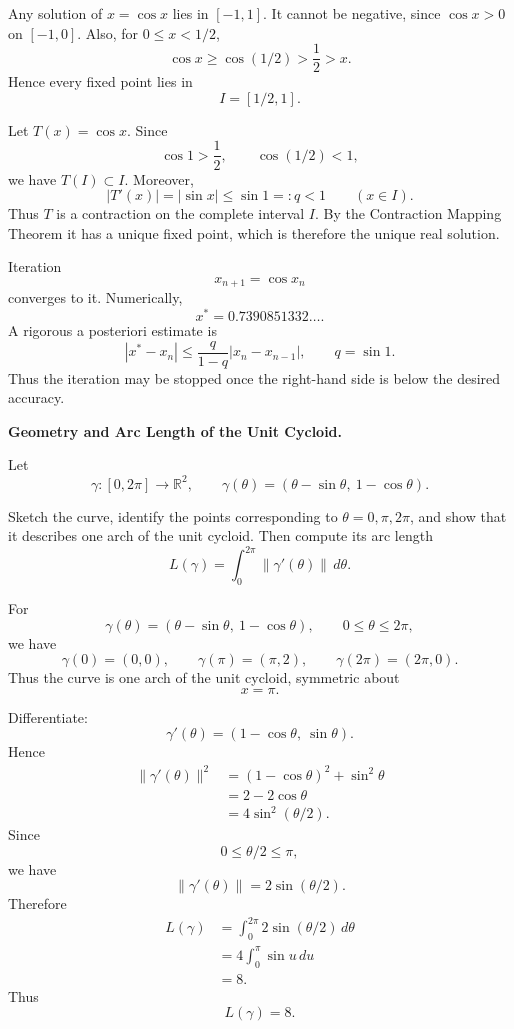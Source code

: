 \begin{solution}
Any solution of \(x=\cos x\) lies in \([-1,1]\). It cannot be negative, since
\(\cos x>0\) on \([-1,0]\). Also, for \(0\le x<1/2\),
\[
\cos x\ge\cos(1/2)>\frac12>x.
\]
Hence every fixed point lies in
\[
I=[1/2,1].
\]

Let \(T(x)=\cos x\). Since
\[
\cos1>\frac12,\qquad \cos(1/2)<1,
\]
we have \(T(I)\subset I\). Moreover,
\[
|T'(x)|=|\sin x|\le\sin1=:q<1
\qquad(x\in I).
\]
Thus \(T\) is a contraction on the complete interval \(I\). By the Contraction Mapping
Theorem it has a unique fixed point, which is therefore the unique real solution.

Iteration
\[
x_{n+1}=\cos x_n
\]
converges to it. Numerically,
\[
\boxed{x^*=0.7390851332\ldots}.
\]
A rigorous a posteriori estimate is
\[
|x^*-x_n|
\le
\frac{q}{1-q}|x_n-x_{n-1}|,
\qquad q=\sin1.
\]
Thus the iteration may be stopped once the right-hand side is below the desired
accuracy.
\end{solution}

\begin{problem}[CP-II-0462]
\label{prob:cp-ii-0462}
\textbf{Geometry and Arc Length of the Unit Cycloid.}

\hspace*{1.5em}Let
\[
\gamma:[0,2\pi]\to\mathbb R^2,
\qquad
\gamma(\theta)
=
(\theta-\sin\theta,\ 1-\cos\theta).
\]

Sketch the curve, identify the points corresponding to
\(\theta=0,\pi,2\pi\), and show that it describes one arch of the
unit cycloid. Then compute its arc length
\[
L(\gamma)
=
\int_0^{2\pi}\|\gamma'(\theta)\|\,d\theta.
\]
\end{problem}

\begin{solution}
For
\[
\gamma(\theta)
=
(\theta-\sin\theta,\ 1-\cos\theta),
\qquad
0\le\theta\le2\pi,
\]
we have
\[
\gamma(0)=(0,0),
\qquad
\gamma(\pi)=(\pi,2),
\qquad
\gamma(2\pi)=(2\pi,0).
\]
Thus the curve is one arch of the unit cycloid, symmetric about
\[
x=\pi.
\]

Differentiate:
\[
\gamma'(\theta)
=
(1-\cos\theta,\ \sin\theta).
\]
Hence
\[
\begin{aligned}
\|\gamma'(\theta)\|^2
&=
(1-\cos\theta)^2+\sin^2\theta\\
&=
2-2\cos\theta\\
&=
4\sin^2(\theta/2).
\end{aligned}
\]
Since
\[
0\le\theta/2\le\pi,
\]
we have
\[
\|\gamma'(\theta)\|
=
2\sin(\theta/2).
\]
Therefore
\[
\begin{aligned}
L(\gamma)
&=
\int_0^{2\pi}
2\sin(\theta/2)\,d\theta\\
&=
4\int_0^\pi\sin u\,du\\
&=
8.
\end{aligned}
\]
Thus
\[
\boxed{L(\gamma)=8.}
\]
\end{solution}


